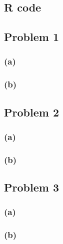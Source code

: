 \begin{appendices}
    \section{R code}

        \subsection*{Problem 1}
            \subsubsection*{(a)}
            \subsubsection*{(b)}

        \subsection*{Problem 2}
            \subsubsection*{(a)}
            \subsubsection*{(b)}

        \subsection*{Problem 3}
            \subsubsection*{(a)}
            \subsubsection*{(b)}

\end{appendices}
